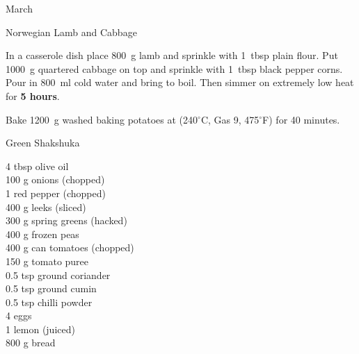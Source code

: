 \begin{menu}{March}
\begin{recipe}{2}{Norwegian Lamb and Cabbage}
\begin{ingredients}
		\end{ingredients}
	
	
    \begin{instructions}
    \item 
        In a casserole dish place
        800~g  lamb
        and sprinkle with
        1~tbsp  plain flour.
        Put
        1000~g quartered cabbage
        on top
        and sprinkle with
        1~tbsp  black pepper corns.
        Pour in
        800~ml  cold water
        and bring to boil.
        Then simmer on extremely low heat for \textbf{5 hours}.
      \item 
    Bake
    1200~g washed baking potatoes
    at
    (240$^{\circ}$C, Gas 9, 475$^{\circ}$F) for 40 minutes.
  
    \end{instructions}
    \end{recipe}%
  
    \begin{recipe}{2}{Green Shakshuka}%
		\begin{ingredients}
		4 tbsp olive oil  \\
	100 g onions (chopped) \\
	1  red pepper (chopped) \\
	400 g leeks (sliced) \\
	300 g spring greens (hacked) \\
	400 g frozen peas  \\
	400 g can tomatoes (chopped) \\
	150 g tomato puree  \\
	0.5 tsp ground coriander  \\
	0.5 tsp ground cumin  \\
	0.5 tsp chilli powder  \\
	4  eggs  \\
	1  lemon (juiced) \\
	800 g bread  \\
	
		\end{ingredients}
	
	

\end{recipe}
\end{menu}

